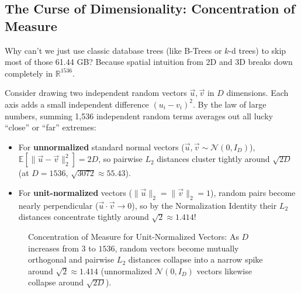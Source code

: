 \subsection{The Curse of Dimensionality: Concentration of Measure}
Why can't we just use classic database trees (like B-Trees or $k$-d trees) to skip most of those 61.44 GB? Because spatial intuition from 2D and 3D breaks down completely in $\mathbb{R}^{1536}$.

Consider drawing two independent random vectors $\vec{u}, \vec{v}$ in $D$ dimensions. Each axis adds a small independent difference $(u_i - v_i)^2$. By the law of large numbers, summing 1,536 independent random terms averages out all lucky ``close'' or ``far'' extremes:
\begin{itemize}[leftmargin=18pt]
  \item For \textbf{unnormalized} standard normal vectors ($\vec{u}, \vec{v} \sim \mathcal{N}(0, I_D)$), $\mathbb{E}[\|\vec{u}-\vec{v}\|_2^2] = 2D$, so pairwise $L_2$ distances cluster tightly around $\sqrt{2D}$ (at $D=1536$, $\sqrt{3072} \approx 55.43$).
  \item For \textbf{unit-normalized} vectors ($\|\vec{u}\|_2 = \|\vec{v}\|_2 = 1$), random pairs become nearly perpendicular ($\vec{u} \cdot \vec{v} \to 0$), so by the Normalization Identity their $L_2$ distances concentrate tightly around $\sqrt{2} \approx 1.414$!
\end{itemize}

\begin{figure}[htbp]
\centering
{}
\caption{Concentration of Measure for Unit-Normalized Vectors: As $D$ increases from $3$ to $1536$, random vectors become mutually orthogonal and pairwise $L_2$ distances collapse into a narrow spike around $\sqrt{2} \approx 1.414$ (unnormalized $\mathcal{N}(0, I_D)$ vectors likewise collapse around $\sqrt{2D}$).}
\label{fig:v2-ch01-concentration}
\end{figure}

